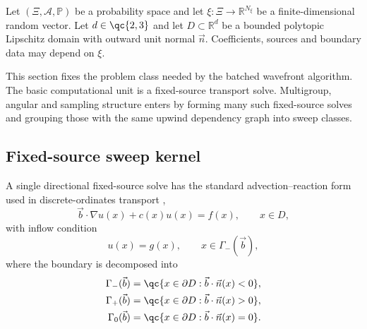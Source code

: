 \documentclass[final]{amsart}
\begin{document}
Let $(\Xi,\mathcal{A},\mathbb{P})$ be a probability space and let
$\xi:\Xi\to\mathbb{R}^{N_\xi}$ be a finite-dimensional random vector.
Let $d\in\qc{2,3}$ and let $D\subset\mathbb{R}^d$ be a bounded
polytopic Lipschitz domain with outward unit normal $\vec n$.
Coefficients, sources and boundary data may depend on $\xi$.

This section fixes the problem class needed by the batched wavefront
algorithm. The basic computational unit is a fixed-source transport
solve. Multigroup, angular and sampling structure enters by forming
many such fixed-source solves and grouping those with the same upwind
dependency graph into sweep classes.

\subsection{Fixed-source sweep kernel}

A single directional fixed-source solve has the standard
advection--reaction form used in discrete-ordinates transport
\cite{LewisMiller1984,AdamsLarsen2002},
\begin{equation}
  \vec b\cdot\nabla u(x)
  +
  c(x)u(x)
  =
  f(x),
  \qquad
  x\in D,
  \label{eq:model_sweep_kernel}
\end{equation}
with inflow condition
\begin{equation}
  u(x)=g(x),
  \qquad
  x\in\Gamma_-(\vec b),
  \label{eq:model_sweep_kernel_inflow}
\end{equation}
where the boundary is decomposed into
\begin{align}
  \Gamma_-(\vec b)
  &=
  \qc{x\in\partial D:\vec b\cdot\vec n(x)<0},
  \\
  \Gamma_+(\vec b)
  &=
  \qc{x\in\partial D:\vec b\cdot\vec n(x)>0},
  \\
  \Gamma_0(\vec b)
  &=
  \qc{x\in\partial D:\vec b\cdot\vec n(x)=0}.
  \label{eq:model_kernel_inflow_outflow_grazing}
\end{align}
\end{document}
